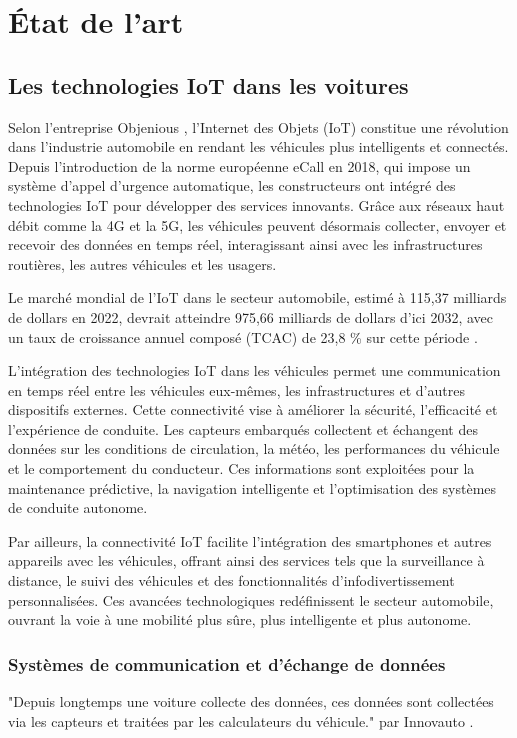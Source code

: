 \section{État de l'art}


\subsection{Les technologies IoT dans les voitures}

Selon l’entreprise Objenious \cite{noauthor_revolution_2025}, l’Internet des Objets (IoT) constitue une révolution dans l’industrie automobile en rendant les véhicules plus intelligents et connectés. Depuis l’introduction de la norme européenne eCall en 2018, qui impose un système d’appel d’urgence automatique, les constructeurs ont intégré des technologies IoT pour développer des services innovants. Grâce aux réseaux haut débit comme la 4G et la 5G, les véhicules peuvent désormais collecter, envoyer et recevoir des données en temps réel, interagissant ainsi avec les infrastructures routières, les autres véhicules et les usagers.

Le marché mondial de l’IoT dans le secteur automobile, estimé à 115,37 milliards de dollars en 2022, devrait atteindre 975,66 milliards de dollars d’ici 2032, avec un taux de croissance annuel composé (TCAC) de 23,8 \% sur cette période \cite{noauthor_taille_2023}.

L’intégration des technologies IoT dans les véhicules permet une communication en temps réel entre les véhicules eux-mêmes, les infrastructures et d’autres dispositifs externes. Cette connectivité vise à améliorer la sécurité, l’efficacité et l’expérience de conduite. Les capteurs embarqués collectent et échangent des données sur les conditions de circulation, la météo, les performances du véhicule et le comportement du conducteur. Ces informations sont exploitées pour la maintenance prédictive, la navigation intelligente et l’optimisation des systèmes de conduite autonome.

Par ailleurs, la connectivité IoT facilite l’intégration des smartphones et autres appareils avec les véhicules, offrant ainsi des services tels que la surveillance à distance, le suivi des véhicules et des fonctionnalités d’infodivertissement personnalisées. Ces avancées technologiques redéfinissent le secteur automobile, ouvrant la voie à une mobilité plus sûre, plus intelligente et plus autonome.


\subsubsection{Systèmes de communication et d’échange de données}
"Depuis longtemps une voiture collecte des données, ces données sont collectées via les capteurs et traitées par les calculateurs du véhicule." par Innovauto \cite{donnees_echange}.

